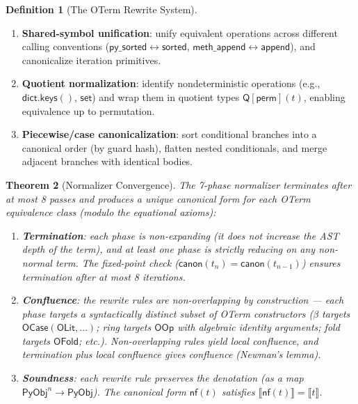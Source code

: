\documentclass[11pt,a4paper]{report}
\theoremstyle{definition}
\newtheorem{definition}{Definition}[chapter]
\theoremstyle{plain}
\newtheorem{theorem}[definition]{Theorem}
\newcommand{\den}[1]{\llbracket #1 \rrbracket}
\newcommand{\PyObj}{\mathsf{PyObj}}
\begin{document}
\begin{definition}[The OTerm Rewrite System]
\begin{enumerate}
  \item \textbf{Shared-symbol unification}: unify equivalent
    operations across different calling conventions
    ($\mathsf{py\_sorted} \leftrightarrow \mathsf{sorted}$,
    $\mathsf{meth\_append} \leftrightarrow \mathsf{append}$),
    and canonicalize iteration primitives.

  \item \textbf{Quotient normalization}: identify nondeterministic
    operations (e.g., $\mathsf{dict.keys()}$, $\mathsf{set}$) and
    wrap them in quotient types
    $\mathsf{Q}[\mathsf{perm}](t)$, enabling equivalence up to
    permutation.

  \item \textbf{Piecewise/case canonicalization}: sort conditional
    branches into a canonical order (by guard hash), flatten nested
    conditionals, and merge adjacent branches with identical bodies.
\end{enumerate}
\end{definition}

\begin{theorem}[Normalizer Convergence]
\label{thm:normalizer-convergent}
The 7-phase normalizer terminates after at most 8 passes and
produces a unique canonical form for each OTerm equivalence class
(modulo the equational axioms):
\begin{enumerate}
  \item \textbf{Termination}: each phase is non-expanding (it does
    not increase the AST depth of the term), and at least one phase
    is strictly reducing on any non-normal term.  The fixed-point
    check ($\mathsf{canon}(t_n) = \mathsf{canon}(t_{n-1})$) ensures
    termination after at most 8 iterations.
  \item \textbf{Confluence}: the rewrite rules are non-overlapping
    by construction --- each phase targets a syntactically distinct
    subset of OTerm constructors ($\beta$ targets
    $\mathsf{OCase}(\mathsf{OLit}, \ldots)$; ring targets
    $\mathsf{OOp}$ with algebraic identity arguments; fold targets
    $\mathsf{OFold}$; etc.).  Non-overlapping rules yield local
    confluence, and termination plus local confluence gives
    confluence (Newman's lemma).
  \item \textbf{Soundness}: each rewrite rule preserves the
    denotation (as a map $\PyObj^n \to \PyObj$).  The canonical
    form $\mathsf{nf}(t)$ satisfies $\den{\mathsf{nf}(t)} = \den{t}$.
\end{enumerate}
\end{theorem}
\end{document}
